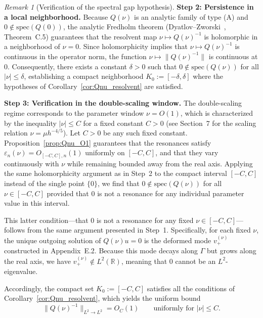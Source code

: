 \documentclass[12pt,a4paper]{amsart}
\theoremstyle{remark}
\newtheorem{remark}[theorem]{Remark}
\begin{document}
\begin{remark}[Verification of the spectral gap hypothesis]
\medskip
\noindent\textbf{Step 2: Persistence in a local neighborhood.}
Because $Q(\nu)$ is an analytic family of type (A) and $0 \notin \mathrm{spec}(Q(0))$, the analytic
Fredholm theorem (Dyatlov--Zworski~\cite{DZ19}, Theorem~C.5) guarantees that the resolvent map
$\nu \mapsto Q(\nu)^{-1}$ is holomorphic in a neighborhood of $\nu = 0$. Since holomorphicity implies that
$\nu \mapsto Q(\nu)^{-1}$ is continuous in the operator norm, the function $\nu \mapsto \|Q(\nu)^{-1}\|$
is continuous at $0$. Consequently, there exists a constant $\delta > 0$ such that $0 \notin \mathrm{spec}(Q(\nu))$
for all $|\nu| \leq \delta$, establishing a compact neighborhood $K_0 := [-\delta, \delta]$ where the hypotheses
of Corollary~\ref{cor:Qnu_resolvent} are satisfied.

\medskip
\noindent\textbf{Step 3: Verification in the double-scaling window.}
The double-scaling regime corresponds to the parameter window $\nu = O(1)$, which is characterized by the
inequality $|\nu| \leq C$ for a fixed constant $C > 0$ (see Section~7 for the scaling relation
$\nu = \mu h^{-4/5}$). Let $C > 0$ be any such fixed constant. Proposition~\ref{prop:Qnu_O1} guarantees
that the resonances satisfy $\varepsilon_n(\nu) = O_{[-C,C],n}(1)$ uniformly on $[-C,C]$, and that they vary
continuously with $\nu$ while remaining bounded away from the real axis. Applying the same holomorphicity argument
as in Step~2 to the compact interval $[-C,C]$ instead of the single point $\{0\}$, we find that
$0 \notin \mathrm{spec}(Q(\nu))$ for all $\nu \in [-C,C]$ provided that $0$ is not a resonance for any individual
parameter value in this interval.

This latter condition—that $0$ is not a resonance for any fixed $\nu \in [-C,C]$—follows from the same argument
presented in Step~1. Specifically, for each fixed $\nu$, the unique outgoing solution of $Q(\nu)u = 0$ is
the deformed mode $v_+^{(\nu)}$ constructed in Appendix~E.2. Because this mode decays along $\Gamma$
but grows along the real axis, we have $v_+^{(\nu)} \notin L^2(\mathbb{R})$, meaning that $0$ cannot be
an $L^2$-eigenvalue.

Accordingly, the compact set $K_0 := [-C,C]$ satisfies all the conditions of Corollary~\ref{cor:Qnu_resolvent},
which yields the uniform bound
\[
  \|Q(\nu)^{-1}\|_{L^2 \to L^2} = O_C(1) \qquad \text{uniformly for } |\nu| \leq C.
\]
\end{remark}
\end{document}
